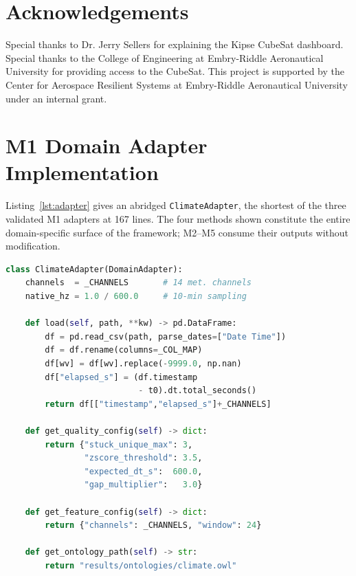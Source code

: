 \documentclass[conference]{IEEEtran}
\begin{document}
\section{Acknowledgements}

Special thanks to Dr. Jerry Sellers for explaining the Kipse CubeSat dashboard. Special thanks to the College of Engineering at Embry-Riddle Aeronautical University for providing access to the CubeSat.
This project is supported by the Center for Aerospace Resilient Systems at Embry-Riddle Aeronautical University under an internal grant.




\appendices

\section{M1 Domain Adapter Implementation}
\label{app:adapter}

Listing~\ref{lst:adapter} gives an abridged \texttt{ClimateAdapter}, the shortest of the three validated M1 adapters at 167 lines. The four methods shown constitute the entire domain-specific surface of the framework; M2--M5 consume their outputs without modification.

\begin{lstlisting}[language=Python,caption={Abridged \texttt{ClimateAdapter}},label={lst:adapter}]
class ClimateAdapter(DomainAdapter):
    channels  = _CHANNELS       # 14 met. channels
    native_hz = 1.0 / 600.0     # 10-min sampling

    def load(self, path, **kw) -> pd.DataFrame:
        df = pd.read_csv(path, parse_dates=["Date Time"])
        df = df.rename(columns=_COL_MAP)
        df[wv] = df[wv].replace(-9999.0, np.nan)
        df["elapsed_s"] = (df.timestamp
                           - t0).dt.total_seconds()
        return df[["timestamp","elapsed_s"]+_CHANNELS]

    def get_quality_config(self) -> dict:
        return {"stuck_unique_max": 3,
                "zscore_threshold": 3.5,
                "expected_dt_s":  600.0,
                "gap_multiplier":   3.0}

    def get_feature_config(self) -> dict:
        return {"channels": _CHANNELS, "window": 24}

    def get_ontology_path(self) -> str:
        return "results/ontologies/climate.owl"
\end{lstlisting}
\end{document}
